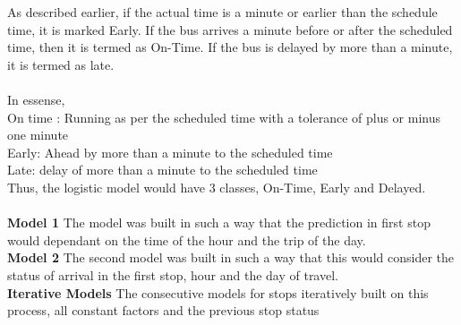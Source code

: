 \documentclass[12pt]{article}\usepackage[]{graphicx}\usepackage[]{color}
\begin{document}
As described earlier, if the actual time is a minute or earlier than the schedule time, it is marked Early. If the bus arrives a minute before or after the scheduled time, then it is termed as On-Time. If the bus is delayed by more than a minute, it is termed as late.\\
\\In essense,\\
On time : Running as per the scheduled time with a tolerance of plus or minus one minute\\
Early: Ahead by more than a minute to the scheduled time\\
Late: delay of more than a minute to the scheduled time\\

Thus, the logistic model would have 3 classes, On-Time, Early and Delayed.\\
\\\textbf{Model 1} The model was built in such a way that the prediction in first stop would dependant on the time of the hour and the trip of the day.\\
\textbf{Model 2} The second model was built in such a way that this would consider the status of arrival in the first stop, hour and the day of travel.\\
\textbf{Iterative Models} The consecutive models for stops iteratively built on this process, all constant factors and the previous stop status
\end{document}
